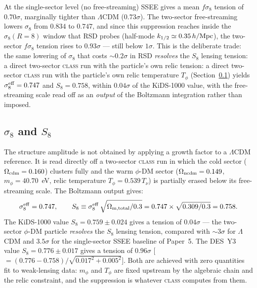 \documentclass[12pt,a4paper]{article}
\newcommand{\sigeff}{\sigma_8^{\rm eff}}
\begin{document}
\noindent
At the single-sector level (no free-streaming) SSEE gives a mean $f\sigma_8$
tension of $0.70\sigma$, marginally tighter than $\Lambda$CDM ($0.73\sigma$).
The two-sector free-streaming lowers $\sigma_8$ from $0.834$ to $0.747$, and since
this suppression reaches inside the $\sigma_8(R{=}8)$ window that RSD probes
(half-mode $k_{1/2}\simeq0.35\,h/{\rm Mpc}$), the two-sector $f\sigma_8$ tension
rises to $0.93\sigma$ --- still below $1\sigma$. This is the deliberate trade:
the same lowering of $\sigma_8$ that costs $\sim0.2\sigma$ in RSD \emph{resolves}
the $S_8$ lensing tension: a direct two-sector \textsc{class} run with the
particle's own relic
tension: a direct two-sector \textsc{class} run with the particle's own relic
temperature $T_\phi$ (Section~\ref{subsec:sigma8}) yields $\sigeff = 0.747$ and
$S_8 = 0.758$, within $0.04\sigma$ of the KiDS-1000 value, with the free-streaming
scale read off as an \emph{output} of the Boltzmann integration rather than imposed.

\subsection{$\sigma_8$ and $S_8$}
\label{subsec:sigma8}

The structure amplitude is not obtained by applying a growth factor to a
$\Lambda$CDM reference. It is read directly off a two-sector \textsc{class} run in
which the cold sector ($\Omega_{\rm cdm}=0.160$) clusters fully and the warm
$\phi$-DM sector ($\Omega_{\rm ncdm}=0.149$, $m_\phi=40.70$~eV, relic temperature
$T_\phi=0.539\,T_\nu$) is partially erased below its free-streaming scale. The
Boltzmann output gives:
\begin{equation}
  \sigeff = 0.747, \qquad
  S_8 \equiv \sigeff\,\sqrt{\Omega_{\rm m,total}/0.3}
       = 0.747 \times \sqrt{0.309/0.3} = 0.758.
  \label{eq:sigma8eff}
\end{equation}
The KiDS-1000 value $S_8 = 0.759 \pm 0.024$ \citep{KiDS2021} gives a tension of
$0.04\sigma$ --- the two-sector $\phi$-DM particle \emph{resolves} the $S_8$ lensing
tension, compared with $\sim3\sigma$ for $\Lambda$CDM and $3.5\sigma$ for the
single-sector SSEE baseline of Paper~5. The DES~Y3 value $S_8 = 0.776 \pm 0.017$
\citep{DESY32022} gives a tension of $0.96\sigma$
[$=(0.776-0.758)/\sqrt{0.017^2+0.005^2}$]. Both are achieved with zero quantities
fit to weak-lensing data: $m_\phi$ and $T_\phi$ are fixed upstream by the algebraic
chain and the relic constraint, and the suppression is whatever \textsc{class}
computes from them.
\end{document}
